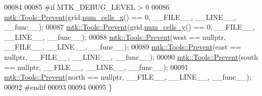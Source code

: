 \begin{DoxyCode}
00084 
00085 \textcolor{preprocessor}{  #if MTK\_DEBUG\_LEVEL > 0}
00086   \hyperlink{classmtk_1_1Tools_afe5bb096309258e2e72503fd7b41c7e0}{mtk::Tools::Prevent}(grid.\hyperlink{classmtk_1_1UniStgGrid2D_a2d182866a398aba8e4829590e85bf939}{num\_cells\_x}() == 0, \_\_FILE\_\_, \_\_LINE\_\_, \_\_func\_\_);
00087   \hyperlink{classmtk_1_1Tools_afe5bb096309258e2e72503fd7b41c7e0}{mtk::Tools::Prevent}(grid.\hyperlink{classmtk_1_1UniStgGrid2D_aed05a801cc9a76dba0ff203cea58a61a}{num\_cells\_y}() == 0, \_\_FILE\_\_, \_\_LINE\_\_, \_\_func\_\_);
00088   \hyperlink{classmtk_1_1Tools_afe5bb096309258e2e72503fd7b41c7e0}{mtk::Tools::Prevent}(west == \textcolor{keyword}{nullptr}, \_\_FILE\_\_, \_\_LINE\_\_, \_\_func\_\_);
00089   \hyperlink{classmtk_1_1Tools_afe5bb096309258e2e72503fd7b41c7e0}{mtk::Tools::Prevent}(east == \textcolor{keyword}{nullptr}, \_\_FILE\_\_, \_\_LINE\_\_, \_\_func\_\_);
00090   \hyperlink{classmtk_1_1Tools_afe5bb096309258e2e72503fd7b41c7e0}{mtk::Tools::Prevent}(south == \textcolor{keyword}{nullptr}, \_\_FILE\_\_, \_\_LINE\_\_, \_\_func\_\_);
00091   \hyperlink{classmtk_1_1Tools_afe5bb096309258e2e72503fd7b41c7e0}{mtk::Tools::Prevent}(north == \textcolor{keyword}{nullptr}, \_\_FILE\_\_, \_\_LINE\_\_, \_\_func\_\_);
00092 \textcolor{preprocessor}{  #endif}
00093 
00094 
00095 \}
\end{DoxyCode}
